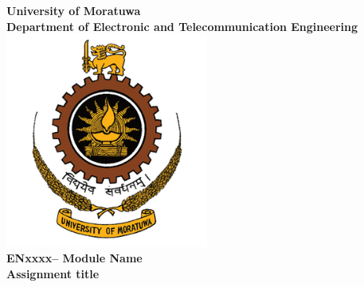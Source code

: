 \documentclass[12pt]{article}
\newcommand{\universityname}{University of Moratuwa}                    %
\newcommand{\departmentname}{Department of Electronic and Telecommunication Engineering}  %
\newcommand{\modulecode}{ENxxxx}                                        %
\newcommand{\modulename}{Module Name}                    %
\newcommand{\assignmentname}{Assignment title}  %
\begin{document}
\begin{titlepage}
    \centering
    \vspace*{1cm}

    {\huge\textbf{\universityname}}\\[1cm]

    {\Large\textbf{\departmentname}}\\[0.5cm]

    \includegraphics[width=0.5\textwidth]{resources/University_of_Moratuwa_logo.png}\\[1cm]

    {\large\textbf{\modulecode – \modulename}}\\[1cm]

    {\LARGE\textbf{\assignmentname}}\\[1cm]
    
    \vspace{0.3cm}
    
    
    

\end{titlepage}
\end{document}
